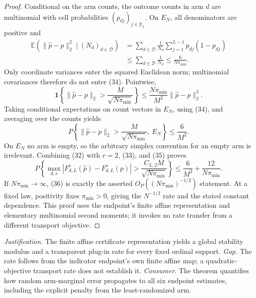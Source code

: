 \documentclass{article}
\begin{document}
\begin{proof}
Conditional on the arm counts, the outcome counts in arm \(d\) are multinomial with cell probabilities \((p_{dj})_{j\in\mathcal Y_L}\).  On \(E_N\), all denominators are positive and
\[
\begin{aligned}
 \mathbb E\!\left(\|\widehat p-p\|_2^2\mid(N_d)_{d\in\mathcal D}\right)
 &=\sum_{d\in\mathcal D}\frac1{N_d}
   \sum_{j=1}^{L-1}p_{dj}(1-p_{dj})\\
 &\leq\sum_{d\in\mathcal D}\frac1{N_d}
 \leq\frac6{N\pi_{\min}}.                                                 \tag{34}
\end{aligned}
\]
Only coordinate variances enter the squared Euclidean norm; multinomial covariances therefore do not enter (34).  Pointwise,
\[
 \mathbf 1\!\left\{\|\widehat p-p\|_2>
       \frac{M}{\sqrt{N\pi_{\min}}}\right\}
 \leq\frac{N\pi_{\min}}{M^2}\|\widehat p-p\|_2^2.
\]
Taking conditional expectations on count vectors in \(E_N\), using (34), and averaging over the counts yields
\[
 P\!\left\{\|\widehat p-p\|_2>
       \frac{M}{\sqrt{N\pi_{\min}}},\ E_N\right\}
 \leq\frac6{M^2}.                                                          \tag{35}
\]
On \(E_N\) no arm is empty, so the arbitrary simplex convention for an empty arm is irrelevant.  Combining (32) with \(r=2\), (33), and (35) proves
\[
 P\!\left\{
 \max_{d,s}|F_{d,L}^s(\widehat p)-F_{d,L}^s(p)|>
 \frac{C_{L,2}M}{\sqrt{N\pi_{\min}}}
 \right\}
 \leq\frac6{M^2}+\frac{12}{N\pi_{\min}}.                                 \tag{36}
\]
If \(N\pi_{\min}\to\infty\), (36) is exactly the asserted \(O_P((N\pi_{\min})^{-1/2})\) statement.  At a fixed law, positivity fixes \(\pi_{\min}>0\), giving the \(N^{-1/2}\) rate and the stated constant dependence.  This proof uses the endpoint's finite affine representation and elementary multinomial second moments; it invokes no rate transfer from a different transport objective.
\end{proof}
\par\smallskip\noindent \textit{Justification.} The finite affine certificate representation yields a global stability modulus and a transparent plug-in rate for every fixed ordinal support. \textit{Gap.} The rate follows from the indicator endpoint's own finite affine map; a quadratic-objective transport rate does not establish it. \textit{Consumer.} The theorem quantifies how random arm-marginal error propagates to all six endpoint estimates, including the explicit penalty from the least-randomized arm.
\end{document}
